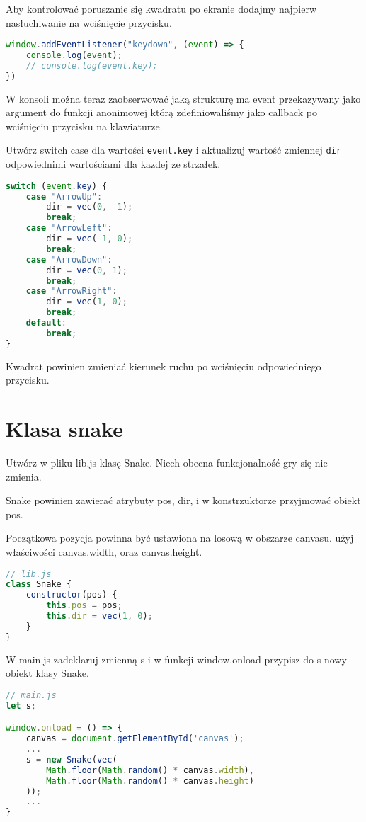 \documentclass[12pt]{article}
\begin{document}
Aby kontrolować poruszanie się kwadratu po ekranie dodajmy najpierw nasłuchiwanie na wciśnięcie przycisku.

\begin{lstlisting}[language=JavaScript]
window.addEventListener("keydown", (event) => {
    console.log(event);
    // console.log(event.key);
})
\end{lstlisting}

W konsoli można teraz zaobserwować jaką strukturę ma event przekazywany jako argument do funkcji anonimowej którą zdefiniowaliśmy jako callback po wciśnięciu przycisku na klawiaturze.

Utwórz switch case dla wartości \texttt{event.key} i aktualizuj wartość zmiennej \texttt{dir} odpowiednimi wartościami dla kazdej ze strzałek.

\begin{lstlisting}[language=JavaScript]
switch (event.key) {
    case "ArrowUp":
        dir = vec(0, -1);
        break;
    case "ArrowLeft":
        dir = vec(-1, 0);
        break;
    case "ArrowDown":
        dir = vec(0, 1);
        break;
    case "ArrowRight":
        dir = vec(1, 0);
        break;
    default:
        break;
}
\end{lstlisting}

Kwadrat powinien zmieniać kierunek ruchu po wciśnięciu odpowiedniego przycisku.

\section{Klasa snake}
Utwórz w pliku lib.js klasę Snake. Niech obecna funkcjonalność gry się nie zmienia.

Snake powinien zawierać atrybuty pos, dir, i w konstrzuktorze przyjmować obiekt pos.

Początkowa pozycja powinna być ustawiona na losową w obszarze canvasu. użyj właściwości canvas.width, oraz canvas.height.

\begin{lstlisting}[language=JavaScript]
// lib.js
class Snake {
    constructor(pos) {
        this.pos = pos;
        this.dir = vec(1, 0);
    }
}
\end{lstlisting}

W main.js zadeklaruj zmienną s i w funkcji window.onload przypisz do s nowy obiekt klasy Snake.

\begin{lstlisting}[language=JavaScript]
// main.js
let s;

window.onload = () => {
    canvas = document.getElementById('canvas');
    ...
    s = new Snake(vec(
        Math.floor(Math.random() * canvas.width),
        Math.floor(Math.random() * canvas.height)
    ));
    ...
}
\end{lstlisting}
\end{document}
